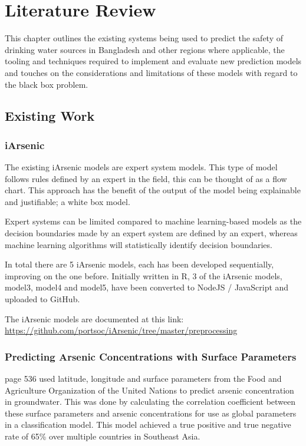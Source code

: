 \chapter{Literature Review}

This chapter outlines the existing systems being used to predict the safety of drinking water sources in Bangladesh and other regions where applicable, the tooling and techniques required to implement and evaluate new prediction models and touches on the considerations and limitations of these models with regard to the black box problem. 

\section{Existing Work}
\label{ew}

\subsection{iArsenic}

The existing iArsenic models are expert system models. This type of model follows rules defined by an expert in the field, this can be thought of as a flow chart. This approach has the benefit of the output of the model being explainable and justifiable; a white box model. 

Expert systems can be limited compared to machine learning-based models as the decision boundaries made by an expert system are defined by an expert, whereas machine learning algorithms will statistically identify decision boundaries.

In total there are 5 iArsenic models, each has been developed sequentially, improving on the one before. Initially written in R, 3 of the iArsenic models, model3, model4 and model5, have been converted to NodeJS / JavaScript and uploaded to GitHub.

The iArsenic models are documented at this link: \url{https://github.com/portsoc/iArsenic/tree/master/preprocessing}

\subsection{Predicting Arsenic Concentrations with Surface Parameters}

\cite{Winkel2008} page 536 used latitude, longitude and surface parameters from the Food and Agriculture Organization of the United Nations to predict arsenic concentration in groundwater. This was done by calculating the correlation coefficient between these surface parameters and arsenic concentrations for use as global parameters in a classification model. This model achieved a true positive and true negative rate of 65\% over multiple countries in Southeast Asia.

